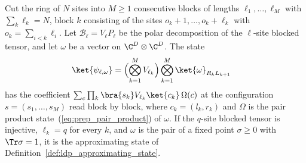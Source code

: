 \begin{definition}
    \label{def:ldp_block_isometry_state}
    \leanok
    Cut the ring of $N$ sites into $M\ge1$ consecutive blocks of lengths
    $\ell_1,\dots,\ell_M$ with $\sum_k\ell_k=N$, block $k$ consisting of the
    sites $o_k+1,\dots,o_k+\ell_k$ with $o_k=\sum_{i<k}\ell_i$. Let
    $\mathcal B_\ell=V_\ell P_\ell$ be the polar decomposition of the
    $\ell$-site blocked tensor, and let $\omega$ be a vector on
    $\C^D\otimes\C^D$. The state
    \begin{align}
        \ket{\psi_{\ell,\omega}}
         & =\Bigl(\bigotimes_{k=1}^MV_{\ell_k}\Bigr)
        \bigotimes_{k=1}^M\ket{\omega}_{R_kL_{k+1}}
        \label{eq:ldp_block_isometry_state}
    \end{align}
    has the coefficient
    $\sum_c\prod_k\bra{s_k}V_{\ell_k}\ket{c_k}\,\Omega(c)$ at the configuration
    $s=(s_1,\dots,s_M)$ read block by block, where $c_k=(l_k,r_k)$ and $\Omega$ is
    the pair product state~(\ref{eq:prep_pair_product}) of $\omega$. If the
    $q$-site blocked tensor is injective, $\ell_k=q$ for every $k$, and $\omega$
    is the pair of a fixed point $\sigma\ge0$ with $\Tr\sigma=1$, it is the
    approximating state of Definition~\ref{def:ldp_approximating_state}.
\end{definition}


